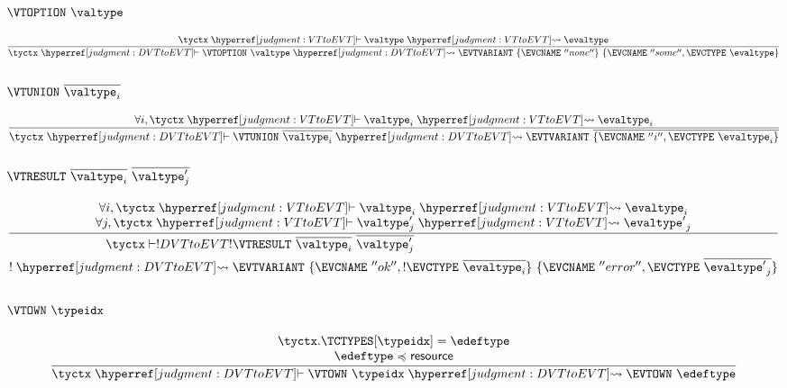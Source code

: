 \subsubsection{$\VTOPTION~\valtype$}

\[
  \frac{
    \tyctx \vdashh!VTtoEVT! \valtype \leadstoh!VTtoEVT! \evaltype
  }{
    \tyctx \vdashh!DVTtoEVT! \VTOPTION~\valtype
    \leadstoh!DVTtoEVT! \EVTVARIANT~\{ \EVCNAME~''none'' \}~\{ \EVCNAME~''some'', \EVCTYPE~\evaltype \}
  }
\]

\subsubsection{$\VTUNION~\overline{\valtype_i}$}
\[
  \frac{
    \forall i, \tyctx \vdashh!VTtoEVT! \valtype_i \leadstoh!VTtoEVT! {\evaltype}_i
  }{
    \tyctx \vdashh!DVTtoEVT! \VTUNION~\overline{\valtype_i}
    \leadstoh!DVTtoEVT! \EVTVARIANT~\overline{\{\EVCNAME~''i'', \EVCTYPE~{\evaltype}_i\}}
  }
\]

\subsubsection{$\VTRESULT~\overline{\valtype_i}~\overline{\valtype'_j}$}

\[
  \frac{
    \begin{array}{@{}c@{}}
    \forall i, \tyctx \vdashh!VTtoEVT! \valtype_i \leadstoh!VTtoEVT! {\evaltype}_i\\
    \forall j, \tyctx \vdashh!VTtoEVT! \valtype'_j \leadstoh!VTtoEVT! {\evaltype'}_j\\
    \end{array}
  }{
    \begin{aligned}
    \tyctx\vdash!DVTtoEVT!{}&\VTRESULT~\overline{\valtype_i}~\overline{\valtype'_j}\\
!     \leadstoh!DVTtoEVT!{}&\EVTVARIANT~\{\EVCNAME~''ok'',! \EVCTYPE~\overline{{\evaltype}_i}\}~\{\EVCNAME~''error'', \EVCTYPE~\overline{{\evaltype'}_j}\}\\
    \end{aligned}
  }
\]

\subsubsection{$\VTOWN~\typeidx$}

\[
  \frac{
    \begin{array}{@{}c@{}}
    \tyctx.\TCTYPES[\typeidx] = \edeftype\\
    \edeftype \subtypeof \ESUBRESOURCE\\
    \end{array}
  }{
    \tyctx \vdashh!DVTtoEVT! \VTOWN~\typeidx \leadstoh!DVTtoEVT! \EVTOWN~\edeftype
  }
\]

